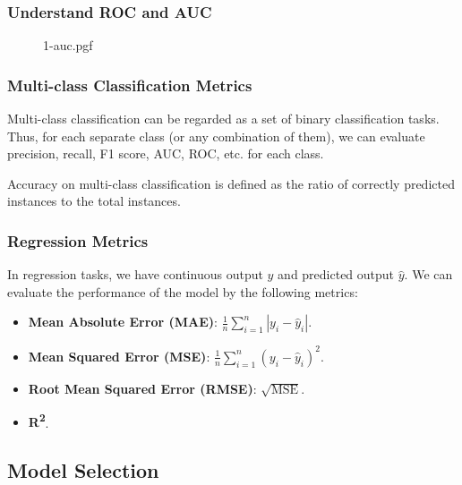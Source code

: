 \documentclass[beamer, en, version=2.0]{huangfusl-template}
\begin{document}
    \begin{frame}
        \frametitle{Understand ROC and AUC}

        \begin{figure}
            {1-auc.pgf}
        \end{figure}
    \end{frame}

    \begin{frame}
        \frametitle{Multi-class Classification Metrics}

        Multi-class classification can be regarded as a set of binary classification tasks. Thus, for each separate class (or any combination of them), we can evaluate precision, recall, F1 score, AUC, ROC, etc. for each class.

        Accuracy on multi-class classification is defined as the ratio of correctly predicted instances to the total instances.
    \end{frame}

    \begin{frame}
        \frametitle{Regression Metrics}

        In regression tasks, we have continuous output $y$ and predicted output $\hat y$. We can evaluate the performance of the model by the following metrics:

        \begin{itemize}
            \item \textbf{Mean Absolute Error (MAE)}: $\frac{1}{n}\sum_{i=1}^n |y_i - \hat y_i|$.
            \item \textbf{Mean Squared Error (MSE)}: $\frac{1}{n}\sum_{i=1}^n (y_i - \hat y_i)^2$.
            \item \textbf{Root Mean Squared Error (RMSE)}: $\sqrt{\text{MSE}}$.
            \item \textbf{R\textsuperscript{2}}.
        \end{itemize}
    \end{frame}

    \subsection{Model Selection}
\end{document}
